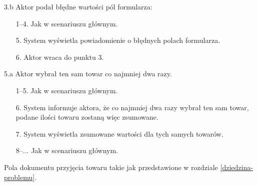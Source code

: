 \begin{usecase}
{\begin{enumerate}
      \end{enumerate}
    \item [3.b] Aktor podał błędne wartości pól formularza:
      \begin{enumerate}
        \item[1--4.] Jak w scenariuszu głównym.
        \item[5.] System wyświetla powiadomienie o błędnych polach formularza.
        \item[6.] Aktor wraca do punktu 3.
      \end{enumerate}
     \item[5.a] Aktor wybrał ten sam towar co najmniej dwa razy.
       \begin{enumerate}
       \item[1--5.] Jak w scenariuszu głównym.
       \item[6.] System informuje aktora, że co najmniej dwa razy wybrał ten sam towar, podane ilości towaru zostaną więc zsumowane.
       \item[7.] System wyświetla zsumowane wartości dla tych samych towarów.
       \item[8--...] Jak w scenariuszu głównym.
       \end{enumerate}
  }
   {
    Pola dokumentu przyjęcia towaru takie jak przedstawione w rozdziale \ref{dziedzina-problemu}.
  }
\end{usecase}

